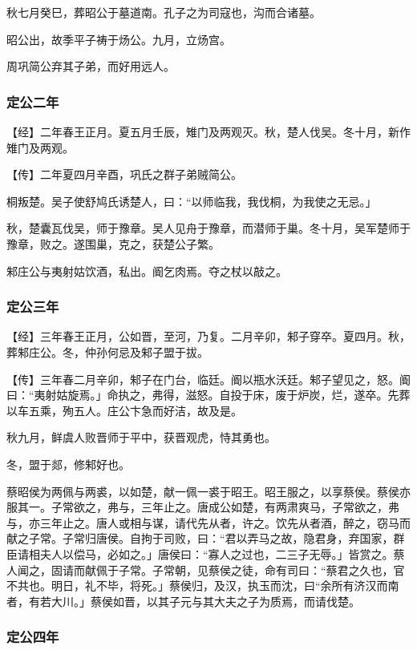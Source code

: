 \documentclass[]{article}
\begin{document}
秋七月癸巳，葬昭公于墓道南。孔子之为司寇也，沟而合诸墓。

昭公出，故季平子祷于炀公。九月，立炀宫。

周巩简公弃其子弟，而好用远人。

\hypertarget{header-n2887}{%
\subsubsection{定公二年}\label{header-n2887}}

【经】二年春王正月。夏五月壬辰，雉门及两观灭。秋，楚人伐吴。冬十月，新作雉门及两观。

【传】二年夏四月辛酉，巩氏之群子弟贼简公。

桐叛楚。吴子使舒鸠氏诱楚人，曰：``以师临我，我伐桐，为我使之无忌。」

秋，楚囊瓦伐吴，师于豫章。吴人见舟于豫章，而潜师于巢。冬十月，吴军楚师于豫章，败之。遂围巢，克之，获楚公子繁。

邾庄公与夷射姑饮酒，私出。阍乞肉焉。夺之杖以敲之。

\hypertarget{header-n2895}{%
\subsubsection{定公三年}\label{header-n2895}}

【经】三年春王正月，公如晋，至河，乃复。二月辛卯，邾子穿卒。夏四月。秋，葬邾庄公。冬，仲孙何忌及邾子盟于拔。

【传】三年春二月辛卯，邾子在门台，临廷。阍以瓶水沃廷。邾子望见之，怒。阍曰：``夷射姑旋焉。」命执之，弗得，滋怒。自投于床，废于炉炭，烂，遂卒。先葬以车五乘，殉五人。庄公卞急而好洁，故及是。

秋九月，鲜虞人败晋师于平中，获晋观虎，恃其勇也。

冬，盟于郯，修邾好也。

蔡昭侯为两佩与两裘，以如楚，献一佩一裘于昭王。昭王服之，以享蔡侯。蔡侯亦服其一。子常欲之，弗与，三年止之。唐成公如楚，有两肃爽马，子常欲之，弗与，亦三年止之。唐人或相与谋，请代先从者，许之。饮先从者酒，醉之，窃马而献之子常。子常归唐侯。自拘于司败，曰：``君以弄马之故，隐君身，弃国家，群臣请相夫人以偿马，必如之。」唐侯曰：``寡人之过也，二三子无辱。」皆赏之。蔡人闻之，固请而献佩于子常。子常朝，见蔡侯之徒，命有司曰：``蔡君之久也，官不共也。明日，礼不毕，将死。」蔡侯归，及汉，执玉而沈，曰``余所有济汉而南者，有若大川。」蔡侯如晋，以其子元与其大夫之子为质焉，而请伐楚。

\hypertarget{header-n2903}{%
\subsubsection{定公四年 }\label{header-n2903}}
\end{document}
